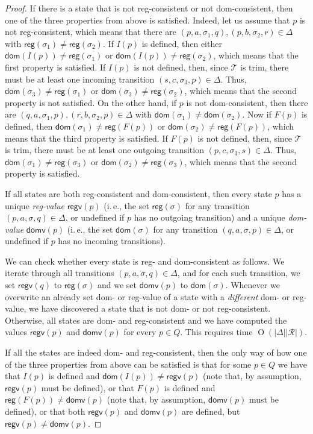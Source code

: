 \documentclass[
a4paper
]{article}
\theoremstyle{plain}
\theoremstyle{definition}
\theoremstyle{remark}
\newcommand{\dom}{\operatorname{dom}}
\newcommand{\Reg}{\mathcal{R}}
\newcommand{\nsst}{\mathcal{T}}
\newcommand{\reg}{\operatorname{reg}}
\renewcommand{\operatorname}[1]{\textsf{#1}}
\DeclareMathOperator{\bigo}{O}
\begin{document}
\begin{proof}
	If there is a state that is not reg-consistent or not dom-consistent, then one of the three properties from above is satisfied. Indeed, let us assume that $p$ is not reg-consistent, which means that there are $(p, a, \sigma_1, q), (p, b, \sigma_2, r) \in \Delta$ with $\reg(\sigma_1) \neq \reg(\sigma_2)$. If $I(p)$ is defined, then either $\dom(I(p)) \neq \reg(\sigma_1)$ or $\dom(I(p)) \neq \reg(\sigma_2)$, which means that the first property is satisfied. If $I(p)$ is not defined, then, since $\nsst$ is trim, there must be at least one incoming transition $(s, c, \sigma_3, p) \in \Delta$. Thus, $\dom(\sigma_3) \neq \reg(\sigma_1)$ or $\dom(\sigma_3) \neq \reg(\sigma_2)$, which means that the second property is not satisfied. On the other hand, if $p$ is not dom-consistent, then there are $(q, a, \sigma_1, p), (r, b, \sigma_2, p) \in \Delta$ with $\dom(\sigma_1) \neq \dom(\sigma_2)$. Now if $F(p)$ is defined, then $\dom(\sigma_1) \neq \reg(F(p))$ or $\dom(\sigma_2) \neq \reg(F(p))$, which means that the third property is satisfied. If $F(p)$ is not defined, then, since $\nsst$ is trim, there must be at least one outgoing transition $(p, c, \sigma_3, s) \in \Delta$. Thus, $\dom(\sigma_1) \neq \reg(\sigma_3)$ or $\dom(\sigma_2) \neq \reg(\sigma_3)$, which means that the second property is satisfied.
	
	If all states are both reg-consistent and dom-consistent, then every state $p$ has a unique \emph{reg-value} $\mathsf{regv}(p)$ (i.\,e., the set $\reg(\sigma)$ for any transition $(p, a, \sigma, q) \in \Delta$, or undefined if $p$ has no outgoing transition) and a unique \emph{dom-value} $\mathsf{domv}(p)$ (i.\,e., the set $\dom(\sigma)$ for any transition $(q, a, \sigma, p) \in \Delta$, or undefined if $p$ has no incoming transitions). 
	
	We can check whether every state is reg- and dom-consistent as follows. We iterate through all transitions $(p, a, \sigma, q) \in \Delta$, and for each such transition, we set $\mathsf{regv}(q)$ to $\reg(\sigma)$ and we set $\mathsf{domv}(p)$ to $\dom(\sigma)$. Whenever we overwrite an already set dom- or reg-value of a state with a \emph{different} dom- or reg-value, we have discovered a state that is not dom- or not reg-consistent. Otherwise, all states are dom- and reg-consistent and we have computed the values $\mathsf{regv}(p)$ and $\mathsf{domv}(p)$ for every $p \in Q$. This requires time $\bigo(|\Delta| |\Reg|)$.
	
	If all the states are indeed dom- and reg-consistent, then the only way of how one of the three properties from above can be satisfied is that for some $p \in Q$ we have that $I(p)$ is defined and $\dom(I(p)) \neq \mathsf{regv}(p)$ (note that, by assumption, $\mathsf{regv}(p)$ must be defined), or that $F(p)$ is defined and $\reg(F(p)) \neq \mathsf{domv}(p)$ (note that, by assumption, $\mathsf{domv}(p)$ must be defined), or that both $\mathsf{regv}(p)$ and $\mathsf{domv}(p)$ are defined, but $\mathsf{regv}(p) \neq \mathsf{domv}(p)$. 
	

\end{proof}
\end{document}
